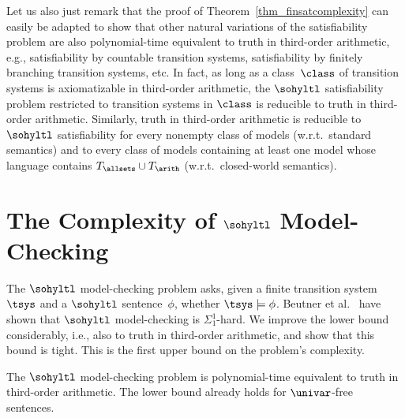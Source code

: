 Let us also just remark that the proof of Theorem~\ref{thm_finsatcomplexity} can easily be adapted to show that other natural variations of the satisfiability problem are also polynomial-time equivalent to  truth in third-order arithmetic, e.g., satisfiability by countable transition systems, satisfiability by finitely branching transition systems, etc.
In fact, as long as a class~$\class$ of transition systems is axiomatizable in third-order arithmetic, the $\sohyltl$ satisfiability problem restricted to transition systems in $\class$ is reducible to truth in third-order arithmetic.
Similarly, truth in third-order arithmetic is reducible to $\sohyltl$ satisfiability for every nonempty class of models (w.r.t.\ standard semantics) and to every class of models containing at least one model whose language contains $T_\allsets \cup T_\arith$ (w.r.t.\ closed-world semantics).

\section{\texorpdfstring{The Complexity of $\sohyltl$ Model-Checking}{The Complexity of Second-order HyperLTL Model-Checking}}
\label{sec_mc}

The $\sohyltl$ model-checking problem asks, given a finite transition system~$\tsys$ and a $\sohyltl$ sentence~$\phi$, whether $\tsys \models \phi$.
Beutner et al.~\cite{DBLP:conf/cav/BeutnerFFM23} have shown that $\sohyltl$ model-checking is $\Sigma_1^1$-hard. 
We improve the lower bound considerably, i.e., also to truth in third-order arithmetic, and show that this bound is tight.
This is the first upper bound on the problem's complexity. 

\begin{thm}
\label{thm_mccomplexity}
The $\sohyltl$ model-checking problem is polynomial-time equivalent to truth in third-order arithmetic. The lower bound already holds for $\univar$-free sentences.
\end{thm}

